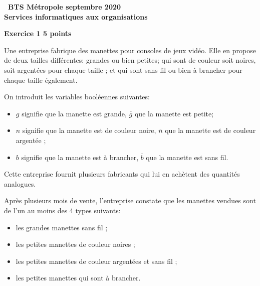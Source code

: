 \documentclass[10pt]{article}
\begin{document}
\setlength\parindent{0mm}
\pagestyle{fancy}
\thispagestyle{empty}

\begin{center} {\Large \textbf{\decofourleft~BTS Métropole septembre 2020~\decofourright\\[5pt]Services informatiques aux organisations}}

\vspace{0,25cm}
  
\end{center}

\textbf{Exercice 1 \hfill 5 points}

\medskip

Une entreprise fabrique des manettes pour consoles de jeux vidéo. Elle en propose de deux tailles différentes: grandes ou bien petites; qui sont de couleur soit noires, soit argentées pour chaque taille ; et qui sont sans fil ou bien à brancher pour chaque taille également. 

On introduit les variables booléennes suivantes:

\setlength\parindent{9mm}
\begin{itemize}[label=\textbullet]
\item $g$ signifie que la manette est grande, $\overline{g}$ que la manette est petite;
\item $n$ signifie que la manette est de couleur noire, $\overline{n}$ que la manette est de couleur
argentée ;
\item $b$ signifie que la manette est à brancher, $\overline{b}$ que la manette est sans fil.
\end{itemize}
\setlength\parindent{0mm}

Cette entreprise fournit plusieurs fabricants qui lui en achètent des quantités analogues. 

Après plusieurs mois de vente, l'entreprise constate que les manettes vendues sont de l'un au moins des 4 types suivants:

\setlength\parindent{9mm}
\begin{itemize}[label=\textbullet]
\item les grandes manettes sans fil ;
\item les petites manettes de couleur noires ;
\item les petites manettes de couleur argentées et sans fil ;
\item les petites manettes qui sont à brancher.
\end{itemize}
\setlength\parindent{0mm}
\end{document}
